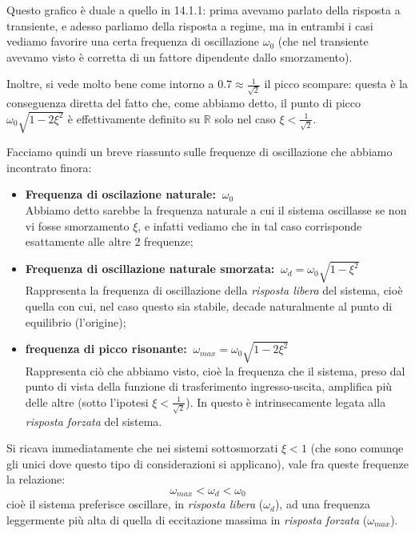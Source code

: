 \documentclass[a4paper,11pt]{article}
\begin{document}
\par\bigskip

Questo grafico è duale a quello in 14.1.1: prima avevamo parlato della risposta a transiente, e adesso parliamo della risposta a regime, ma in entrambi i casi vediamo favorire una certa frequenza di oscillazione $\omega_0$ (che nel transiente avevamo visto è corretta di un fattore dipendente dallo smorzamento).

Inoltre, si vede molto bene come intorno a $0.7 \approx \frac{1}{\sqrt{2}}$ il picco scompare: questa è la conseguenza diretta del fatto che, come abbiamo detto, il punto di picco $\omega_0 \sqrt{1 - 2 \xi^2}$ è effettivamente definito su $\mathbb{R}$ solo nel caso $\xi < \frac{1}{\sqrt{2}}$.

\par\smallskip

Facciamo quindi un breve riassunto sulle frequenze di oscillazione che abbiamo incontrato finora:
\begin{itemize}
	\item \textbf{Frequenza di oscilazione naturale:} $\ \omega_0$ \\
		Abbiamo detto sarebbe la frequenza naturale a cui il sistema oscillasse se non vi fosse smorzamento $\xi$, e infatti vediamo che in tal caso corrisponde esattamente alle altre 2 frequenze; 
	\item \textbf{Frequenza di oscillazione naturale smorzata:} $\ \omega_d = \omega_0 \sqrt{1 - \xi^2}$ \\
		Rappresenta la frequenza di oscillazione della \textit{risposta libera} del sistema, cioè quella con cui, nel caso questo sia stabile, decade naturalmente al punto di equilibrio (l'origine); 
	\item \textbf{frequenza di picco risonante:} $\ \omega_{max} = \omega_0 \sqrt{1 - 2 \xi^2}$ \\
		Rappresenta ciò che abbiamo visto, cioè la frequenza che il sistema, preso dal punto di vista della funzione di trasferimento ingresso-uscita, amplifica più delle altre (sotto l'ipotesi $\xi < \frac{1}{\sqrt2}$). In questo è intrinsecamente legata alla \textit{risposta forzata} del sistema.
\end{itemize}

Si ricava immediatamente che nei sistemi sottosmorzati $\xi < 1$ (che sono comunqe gli unici dove questo tipo di considerazioni si applicano), vale fra queste frequenze la relazione:
$$
\omega_{max} < \omega_d < \omega_0
$$
cioè il sistema preferisce oscillare, in \textit{risposta libera} ($\omega_d$), ad una frequenza leggermente più alta di quella di eccitazione massima in \textit{risposta forzata} ($\omega_{max}$).
\end{document}
